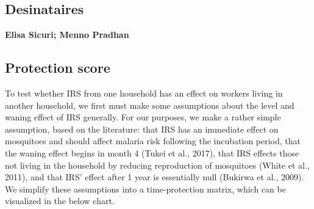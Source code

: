 \documentclass[]{article}
\begin{document}
\noindent{}

\vfill
\null

\subsection*{Desinataires}

\textbf{Elisa Sicuri; Menno Pradhan}

\vspace{3mm}

\newpage

\subsection{Protection score}\label{protection-score}

To test whether IRS from one household has an effect on workers living
in another household, we first must make some assumptions about the
level and waning effect of IRS generally. For our purposes, we make a
rather simple assumption, based on the literature: that IRS has an
immediate effect on mosquitoes and should affect malaria risk following
the incubation period, that the waning effect begins in month 4 (Tukei
et al., 2017), that IRS effects those not living in the household by
reducing reproduction of mosquitoes (White et al., 2011), and that IRS'
effect after 1 year is essentially null (Bukirwa et al., 2009). We
simplify these assumptions into a time-protection matrix, which can be
visualized in the below chart.
\end{document}
